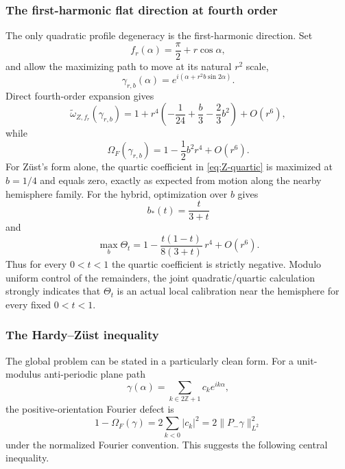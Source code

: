 \documentclass[11pt]{article}
\newcommand{\Z}{\mathbb Z}
\begin{document}
\subsubsection{The first-harmonic flat direction at fourth order}

The only quadratic profile degeneracy is the first-harmonic direction.
Set
\[
        f_r(\alpha)
        =\frac{\pi}{2}+r\cos\alpha,
\]
and allow the maximizing path to move at its natural $r^2$ scale,
\[
        \gamma_{r,b}(\alpha)
        =
        e^{i(\alpha+r^2b\sin2\alpha)}.
\]
Direct fourth-order expansion gives
\begin{equation}\label{eq:Z-quartic}
 \widetilde\omega_{Z,f_r}(\gamma_{r,b})
 =
 1+r^4
 \left(
 -\frac1{24}
 +\frac b3
 -\frac23b^2
 \right)
 +O(r^6),
\end{equation}
while
\begin{equation}\label{eq:F-quartic}
 \Omega_F(\gamma_{r,b})
 =
 1-\frac12b^2r^4+O(r^6).
\end{equation}
For Z\"ust's form alone, the quartic coefficient in
\eqref{eq:Z-quartic} is maximized at $b=1/4$ and equals zero, exactly as
expected from motion along the nearby hemisphere family.  For the hybrid,
optimization over $b$ gives
\begin{equation}\label{eq:hybrid-bstar}
        b_*(t)=\frac{t}{3+t}
\end{equation}
and
\begin{equation}\label{eq:hybrid-quartic}
 \max_b\Theta_t
 =
 1-\frac{t(1-t)}{8(3+t)}\,r^4+O(r^6).
\end{equation}
Thus for every $0<t<1$ the quartic coefficient is strictly negative.
Modulo uniform control of the remainders, the joint quadratic/quartic
calculation strongly indicates that $\Theta_t$ is an actual local
calibration near the hemisphere for every fixed $0<t<1$.

\subsubsection{The Hardy--Z\"ust inequality}

The global problem can be stated in a particularly clean form.  For a
unit-modulus anti-periodic plane path
\[
        \gamma(\alpha)
        =\sum_{k\in2\Z+1}c_ke^{ik\alpha},
\]
the positive-orientation Fourier defect is
\begin{equation}\label{eq:hardy-defect-hybrid}
        1-\Omega_F(\gamma)
        =
        2\sum_{k<0}|c_k|^2
        =
        2\|P_-\gamma\|_{L^2}^2
\end{equation}
under the normalized Fourier convention.  This suggests the following
central inequality.
\end{document}
